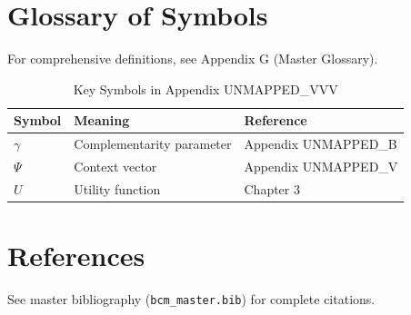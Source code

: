 \section{Glossary of Symbols}
\label{sec:vvv-glossary}

For comprehensive definitions, see Appendix G (Master Glossary).

\begin{table}[htbp]
\centering
\caption{Key Symbols in Appendix UNMAPPED_VVV}
\begin{tabular}{lll}
\toprule
\textbf{Symbol} & \textbf{Meaning} & \textbf{Reference} \\
\midrule
$\gamma$ & Complementarity parameter & Appendix UNMAPPED_B \\
$\Psi$ & Context vector & Appendix UNMAPPED_V \\
$U$ & Utility function & Chapter 3 \\
\bottomrule
\end{tabular}
\end{table}


\section{References}
\label{sec:vvv-references}

See master bibliography (\texttt{bcm\_master.bib}) for complete citations.

\nocite{bcm_master}

